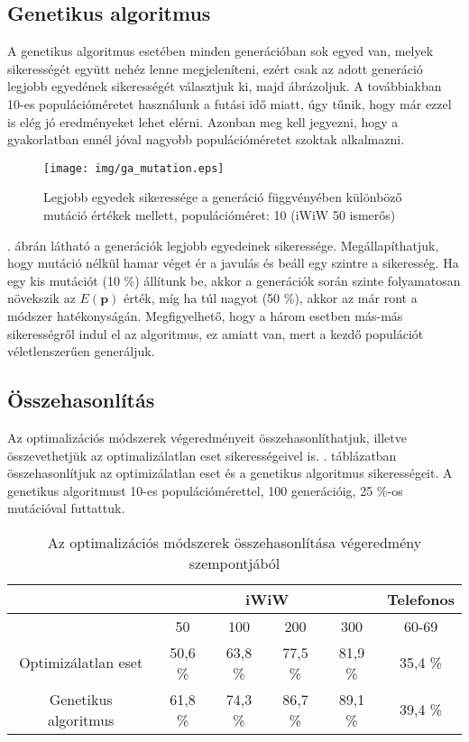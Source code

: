 \documentclass[12pt]{article}
\begin{document}
\subsection{Genetikus algoritmus}
A genetikus algoritmus esetében minden generációban sok egyed van, melyek sikerességét együtt nehéz lenne megjeleníteni, ezért csak az adott generáció legjobb egyedének sikerességét választjuk ki, majd ábrázoljuk. A továbbiakban 10-es populációméretet használunk a futási idő miatt, úgy tűnik, hogy már ezzel is elég jó eredményeket lehet elérni. Azonban meg kell jegyezni, hogy a gyakorlatban ennél jóval nagyobb populációméretet szoktak alkalmazni.
\begin{figure}[H]
	\centering
	\texttt{[image: img/ga\_mutation.eps]}
	\caption{Legjobb egyedek sikeressége a generáció függvényében különböző mutáció értékek mellett, populációméret: 10 (iWiW 50 ismerős)}
	\label{ga_mutation}
\end{figure}
. ábrán látható a generációk legjobb egyedeinek sikeressége. Megállapíthatjuk, hogy mutáció nélkül hamar véget ér a javulás és beáll egy szintre a sikeresség. Ha egy kis mutációt (10 \%) állítunk be, akkor a generációk során szinte folyamatosan növekszik az $E(\mathbf{p})$ érték, míg ha túl nagyot (50 \%), akkor az már ront a módszer hatékonyságán. Megfigyelhető, hogy a három esetben \mbox{más-más} sikerességről indul el az algoritmus, ez amiatt van, mert a kezdő populációt véletlenszerűen generáljuk.

\subsection{Összehasonlítás}
Az optimalizációs módszerek végeredményeit összehasonlíthatjuk, illetve összevethetjük az optimalizálatlan eset sikerességeivel is. . táblázatban összehasonlítjuk az optimizálatlan eset és a genetikus algoritmus sikerességeit. A genetikus algoritmust 10-es populációmérettel, 100 generációig, 25 \%-os mutációval futtattuk.
\begin{table}[H]
	\centering
	\begin{tabular}{|c|c|c|c|c|c|}
		\hline
		 & \multicolumn{4}{|c|}{iWiW} & Telefonos \\
		\hline
		 & 50 & 100 & 200 & 300 & 60-69 \\
		 \hline
		 Optimizálatlan eset & 50,6 \% & 63,8 \% & 77,5 \% & 81,9 \% & 35,4 \% \\
		 \hline
		 Genetikus algoritmus & 61,8 \% & 74,3 \% & 86,7 \% & 89,1 \% & 39,4 \% \\
		 \hline
	\end{tabular}
	\caption{Az optimalizációs módszerek összehasonlítása végeredmény szempontjából}
	\label{eredmeny_osszehasonlitas}
\end{table}
\end{document}
